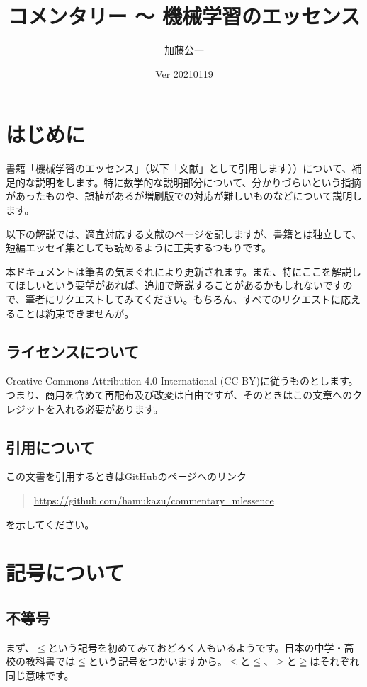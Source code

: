 \documentclass[11pt]{article}
\title{コメンタリー 〜 機械学習のエッセンス}
\author{加藤公一}
\date{Ver 20210119}
\begin{document}
\maketitle
\section{はじめに}

書籍「機械学習のエッセンス」（以下「文献\cite{mle}」として引用します））について、補足的な説明をします。特に数学的な説明部分について、分かりづらいという指摘があったものや、誤植があるが増刷版での対応が難しいものなどについて説明します。

以下の解説では、適宜対応する文献\cite{mle}のページを記しますが、書籍とは独立して、短編エッセイ集としても読めるように工夫するつもりです。

本ドキュメントは筆者の気まぐれにより更新されます。また、特にここを解説してほしいという要望があれば、追加で解説することがあるかもしれないですので、筆者にリクエストしてみてください。もちろん、すべてのリクエストに応えることは約束できませんが。

\subsection{ライセンスについて}

Creative Commons Attribution 4.0 International (CC BY)に従うものとします。
つまり、商用を含めて再配布及び改変は自由ですが、そのときはこの文章へのクレジットを入れる必要があります。

\subsection{引用について}

この文書を引用するときはGitHubのページへのリンク
\begin{quote}
  \url{https://github.com/hamukazu/commentary_mlessence}
\end{quote}
を示してください。

\section{記号について}

\subsection{不等号}
  まず、$\leq$という記号を初めてみておどろく人もいるようです。日本の中学・高校の教科書では$\leqq$という記号をつかいますから。$\leq$と$\leqq$、$\geq$と$\geqq$はそれぞれ同じ意味です。
\end{document}
